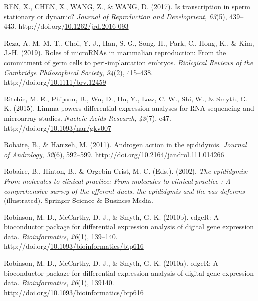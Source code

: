 \documentclass[12pt,twoside]{reedthesis}
\newlength{\cslhangindent}
\newenvironment{CSLReferences}[2] %
 {%
  \setlength{\parindent}{0pt}
  \ifodd #1 \everypar{\setlength{\hangindent}{\cslhangindent}}\ignorespaces\fi
  \ifnum #2 > 0
  \setlength{\parskip}{#2\baselineskip}
  \fi
 }%
 {}
\begin{document}
\begin{CSLReferences}{1}{0}
\leavevmode{}%
REN, X., CHEN, X., WANG, Z., \& WANG, D. (2017). Is transcription in sperm stationary or dynamic? \emph{Journal of Reproduction and Development}, \emph{63}(5), 439--443. http://doi.org/\href{https://doi.org/10.1262/jrd.2016-093}{10.1262/jrd.2016-093}

\leavevmode{}%
Reza, A. M. M. T., Choi, Y.-J., Han, S. G., Song, H., Park, C., Hong, K., \& Kim, J.-H. (2019). Roles of {microRNAs} in mammalian reproduction: From the commitment of germ cells to peri-implantation embryos. \emph{Biological Reviews of the Cambridge Philosophical Society}, \emph{94}(2), 415--438. http://doi.org/\href{https://doi.org/10.1111/brv.12459}{10.1111/brv.12459}

\leavevmode{}%
Ritchie, M. E., Phipson, B., Wu, D., Hu, Y., Law, C. W., Shi, W., \& Smyth, G. K. (2015). Limma powers differential expression analyses for RNA-sequencing and microarray studies. \emph{Nucleic Acids Research}, \emph{43}(7), e47. http://doi.org/\href{https://doi.org/10.1093/nar/gkv007}{10.1093/nar/gkv007}

\leavevmode{}%
Robaire, B., \& Hamzeh, M. (2011). Androgen action in the epididymis. \emph{Journal of Andrology}, \emph{32}(6), 592--599. http://doi.org/\href{https://doi.org/10.2164/jandrol.111.014266}{10.2164/jandrol.111.014266}

\leavevmode{}%
Robaire, B., Hinton, B., \& Orgebin-Crist, M.-C. (Eds.). (2002). \emph{The epididymis: From molecules to clinical practice: From molecules to clinical practice : A comprehensive survey of the efferent ducts, the epididymis and the vas deferens} (illustrated). Springer Science \& Business Media.

\leavevmode{}%
Robinson, M. D., McCarthy, D. J., \& Smyth, G. K. (2010b). {edgeR}: A bioconductor package for differential expression analysis of digital gene expression data. \emph{Bioinformatics}, \emph{26}(1), 139--140. http://doi.org/\href{https://doi.org/10.1093/bioinformatics/btp616}{10.1093/bioinformatics/btp616}

\leavevmode{}%
Robinson, M. D., McCarthy, D. J., \& Smyth, G. K. (2010a). edgeR: A bioconductor package for differential expression analysis of digital gene expression data. \emph{Bioinformatics}, \emph{26}(1), 139140. http://doi.org/\href{https://doi.org/10.1093/bioinformatics/btp616}{10.1093/bioinformatics/btp616}


\end{CSLReferences}
\end{document}
